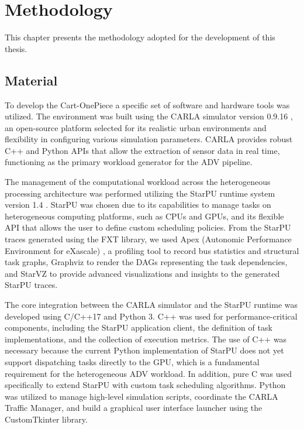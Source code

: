 \chapter{Methodology}

This chapter presents the methodology adopted for the development of this thesis.

\section{Material}

To develop the Cart-OnePiece a specific set of software and hardware tools was utilized. The environment was built using the CARLA simulator version 0.9.16 \cite{Dosovitskiy2017}, an open-source platform selected for its realistic urban environments and flexibility in configuring various simulation parameters. CARLA provides robust C++ and Python APIs that allow the extraction of sensor data in real time, functioning as the primary workload generator for the ADV pipeline.

The management of the computational workload across the heterogeneous processing architecture was performed utilizing the StarPU runtime system version 1.4 \cite{Augonnet2011StarPU:Architectures}. StarPU was chosen due to its capabilities to manage tasks on heterogeneous computing platforms, such as CPUs and GPUs, and its flexible API that allows the user to define custom scheduling policies. From the StarPU traces generated using the FXT library, we used Apex (Autonomic Performance Environment for eXascale)  \cite{Huck2015APEX}, a profiling tool to record bus statistics and structural task graphs, Graphviz \cite{Gansner2000Graphviz} to render the DAGs representing the task dependencies, and StarVZ \cite{Pinto2021StarVZ}to provide advanced visualizations and insights to the generated StarPU traces.

The core integration between the CARLA simulator and the StarPU runtime was developed using C/C++17 and Python 3. C++ was used for performance-critical components, including the StarPU application client, the definition of task implementations, and the collection of execution metrics. The use of C++ was necessary because the current Python implementation of StarPU does not yet support dispatching tasks directly to the GPU, which is a fundamental requirement for the heterogeneous ADV workload. In addition, pure C was used specifically to extend StarPU with custom task scheduling algorithms. Python was utilized to manage high-level simulation scripts, coordinate the CARLA Traffic Manager, and build a graphical user interface launcher using the CustomTkinter library.

